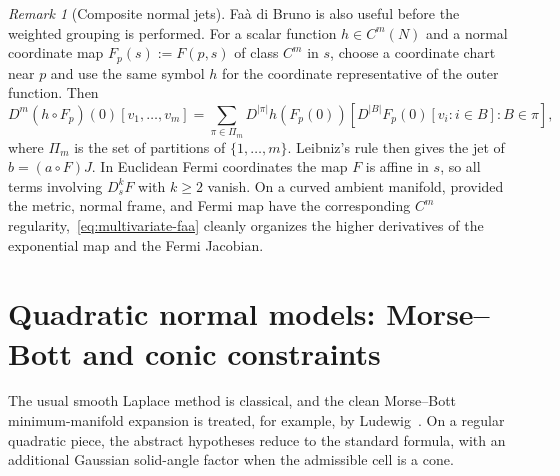 \documentclass[11pt]{amsart}
\numberwithin{equation}{section}
\theoremstyle{definition}
\theoremstyle{remark}
\newtheorem{remark}[theorem]{Remark}
\begin{document}
\begin{remark}[Composite normal jets]\label{rem:faa-composition}
Fa\`a di Bruno is also useful before the weighted grouping is performed.
For a scalar function $h\in C^m(N)$ and a normal coordinate map
$F_p(s):=F(p,s)$ of class $C^m$ in $s$, choose a coordinate chart near $p$ and
use the same symbol $h$ for the coordinate representative of the outer
function.  Then
\begin{equation}\label{eq:multivariate-faa}
 D^m(h\circ F_p)(0)[v_1,\ldots,v_m]
 =\sum_{\pi\in\Pi_m}
 D^{|\pi|}h(F_p(0))
 \left[
 D^{|B|}F_p(0)[v_i:i\in B]:B\in\pi
 \right],
\end{equation}
where $\Pi_m$ is the set of partitions of $\{1,\ldots,m\}$.  Leibniz's rule
then gives the jet of $b=(a\circ F)J$.  In Euclidean Fermi coordinates the map
$F$ is affine in $s$, so all terms involving $D_s^k F$ with $k\ge2$ vanish.  On
a curved ambient manifold, provided the metric, normal frame, and Fermi map
have the corresponding $C^m$ regularity,~\eqref{eq:multivariate-faa} cleanly
organizes the higher derivatives of the exponential map and the Fermi
Jacobian.
\end{remark}

\section{Quadratic normal models: Morse--Bott and conic constraints}
\label{sec:quadratic-models}

The usual smooth Laplace method is classical, and the clean Morse--Bott
minimum-manifold expansion is treated, for example, by Ludewig~\cite{Ludewig}.
On a regular quadratic piece, the abstract hypotheses reduce to the standard
formula, with an additional Gaussian solid-angle factor when the admissible cell
is a cone.
\end{document}
